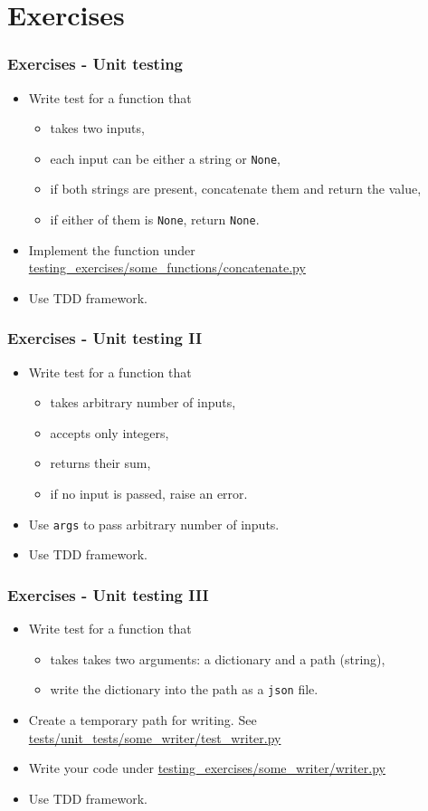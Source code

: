 \documentclass[9pt,xcolor=dvipsnames]{beamer}
\begin{document}
\section{Exercises}
\begin{frame}
  \frametitle{Exercises - Unit testing}
  \begin{itemize}
  \item Write test for a function that
    \begin{itemize}
    \item takes two inputs,
    \item each input can be either a string or {\tt None},
    \item if both strings are present, concatenate them and return
      the value,
    \item if either of them is {\tt None}, return {\tt None}. 
    \end{itemize}
  \item Implement the function under
    \url{testing_exercises/some_functions/concatenate.py}
  \item Use TDD framework.
  \end{itemize}
\end{frame}

\begin{frame}
  \frametitle{Exercises - Unit testing II}
  \begin{itemize}
  \item Write test for a function that
    \begin{itemize}
    \item takes arbitrary number of inputs,
    \item accepts only integers,
    \item returns their sum,
    \item if no input is passed, raise an error.
    \end{itemize}
  \item Use {\tt *args} to pass arbitrary number of inputs.
    \item Use TDD framework.
  \end{itemize}
\end{frame}

\begin{frame}
  \frametitle{Exercises - Unit testing III}
  \begin{itemize}
  \item Write test for a function that
    \begin{itemize}
    \item takes takes two arguments: a dictionary and a path (string),
    \item write the dictionary into the path as a {\tt json} file.
    \end{itemize}
  \item Create a temporary path for writing.
    See \url{tests/unit_tests/some_writer/test_writer.py}
  \item Write your code under
    \url{testing_exercises/some_writer/writer.py}
  \item Use TDD framework.
  \end{itemize}
\end{frame}
\end{document}
